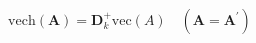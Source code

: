 \begin{equation}
    \mathrm{vech}
    \left(
    \mathbf{A}
    \right)
    =
    \mathbf{D}_{k}^{+}
    \mathrm{vec}
    \left(
    A
    \right)
    \quad
    \left(
    \mathbf{A} = \mathbf{A}^{\prime}
    \right)
    \label{eq:linearAlgebra-vech-and-pinv-of-dcap}
\end{equation}
